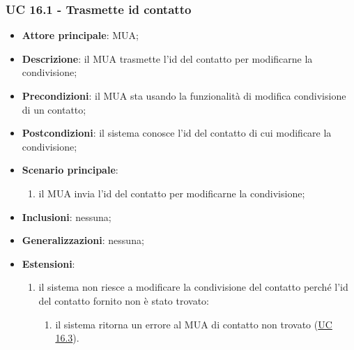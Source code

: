     \subsubsection{UC 16.1 - Trasmette id contatto} \label{sec:UC16.1}
    \begin{itemize}
        \item \textbf{Attore principale}: MUA;
        \item \textbf{Descrizione}: il MUA trasmette l'id del contatto per modificarne la condivisione;
        \item \textbf{Precondizioni}: il MUA sta usando la funzionalità di modifica condivisione di un contatto;
        \item \textbf{Postcondizioni}: il sistema conosce l'id del contatto di cui modificare la condivisione;
        \item \textbf{Scenario principale}:
            \begin{enumerate}
                \item il MUA invia l'id del contatto per modificarne la condivisione;
            \end{enumerate}
        \item \textbf{Inclusioni}: nessuna;
        \item \textbf{Generalizzazioni}: nessuna;
        \item \textbf{Estensioni}:
            \begin{enumerate}[label=\alph*.]
                \item il sistema non riesce a modificare la condivisione del contatto perché l'id del contatto fornito non è stato trovato:
                \begin{enumerate}[label=\arabic*.]
                    \item il sistema ritorna un errore al MUA di contatto non trovato (\hyperref[sec:UC16.3]{UC 16.3}).
                \end{enumerate}
            \end{enumerate}
    \end{itemize}


